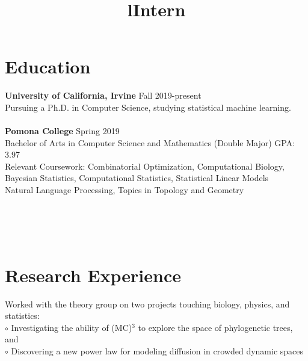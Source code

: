 \documentclass[margin]{res}
\begin{document}
\begin{resume}

\section{Education}
\textbf{University of California, Irvine} \hfill Fall 2019-present\\
Pursuing a Ph.D. in Computer Science, studying statistical machine learning.\\ \\
\textbf{Pomona College} \hfill Spring 2019\\
Bachelor of Arts in Computer Science and Mathematics (Double Major) \hfill GPA: 3.97\\
Relevant Coursework: Combinatorial Optimization, Computational Biology,\\
Bayesian Statistics, Computational Statistics, Statistical Linear Models\\
Natural Language Processing, Topics in Topology and Geometry


\begin{format}
\title{l}\\
\\
\body\\
\end{format}
\section{Research Experience}

\title{\textbf{Intern}}
\begin{position}
Worked with the theory group on two projects touching biology, physics, and statistics:\\
$\circ$ Investigating the ability of (MC)$^3$ to explore the space of phylogenetic trees, and \\
$\circ$ Discovering a new power law for modeling diffusion in crowded dynamic spaces
\end{position}


\end{resume}
\end{document}
